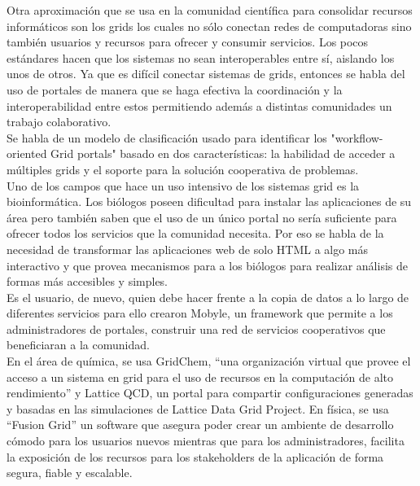 Otra aproximación que se usa en la comunidad científica para consolidar recursos informáticos son los grids los cuales no sólo conectan redes de computadoras sino también usuarios y recursos para ofrecer y consumir servicios. Los pocos estándares hacen que los sistemas no sean interoperables entre sí, aislando los unos de otros. 
Ya que es difícil conectar sistemas de grids, entonces se habla del uso de portales de manera que se haga efectiva la coordinación y la interoperabilidad entre estos permitiendo además a distintas comunidades un trabajo colaborativo.\\

Se habla de un modelo de clasificación usado para identificar los "workflow-oriented Grid portals" basado en dos características: la habilidad de acceder a múltiples grids y el soporte para la solución cooperativa de problemas\cite{Kacsuk:2006}.\\

Uno de los campos que hace un uso intensivo de los sistemas grid es la bioinformática. Los biólogos poseen dificultad para instalar las aplicaciones de su área pero también saben que el uso de un único portal no sería suficiente para ofrecer todos los servicios que la comunidad necesita. Por eso se habla de la necesidad de transformar las aplicaciones web de solo HTML a algo más interactivo y que provea mecanismos para a los biólogos para realizar análisis de formas más accesibles y simples\cite{Gordon:2007}\cite{Javahery:2004}.\\

Es el usuario, de nuevo, quien debe hacer frente a la copia de datos a lo largo de diferentes servicios para ello crearon Mobyle\cite{Bertrand:2009}, un framework que permite a los administradores de portales, construir una red de servicios cooperativos que beneficiaran a la comunidad.\\

En el área de química, se usa GridChem\cite{GridChem}, “una organización virtual que provee el acceso a un sistema en grid para el uso de recursos en la computación de alto rendimiento” y Lattice QCD, un portal para compartir configuraciones generadas y basadas en las simulaciones de Lattice Data Grid Project\cite{QCD}. En física, se usa “Fusion Grid”\cite{Fusion} un software que asegura poder crear un ambiente de desarrollo cómodo para los usuarios nuevos mientras que para los administradores, facilita la exposición de los recursos para los stakeholders de la aplicación de forma segura, fiable y escalable.\\

